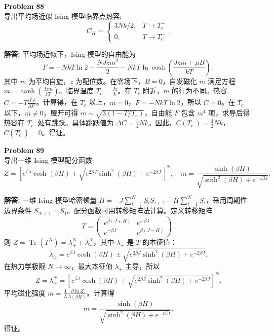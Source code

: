 \documentclass[12pt, a4paper, oneside]{ctexart}
\newenvironment{solution}{\par\noindent\textbf{解答:}\quad}{\par}
\begin{document}
\begin{mdframed}[backgroundcolor=gray!10, linewidth=0pt]
    \textbf{Problem 88} \\
    导出平均场近似 Ising 模型临界点热容:
    \[
    C_H = \begin{cases}
        3 N k / 2, & T \to T_c^- \\
        0, & T \to T_c^+
    \end{cases}.
    \]
\end{mdframed}
\begin{solution}
    平均场近似下，Ising 模型的自由能为
    \[
    F = -N k T \ln 2 + \frac{N J z m^2}{2} - N k T \ln \cosh \left( \frac{J z m + \mu B}{k T} \right),
    \]
    其中 $m$ 为平均自旋，$z$ 为配位数。在零场下，$B=0$，自发磁化 $m$ 满足方程 $m = \tanh \left( \frac{J z m}{k T} \right)$。临界温度 $T_c = \frac{J z}{k}$。在 $T_c$ 附近，$m$ 的行为不同。热容 $C = -T \frac{\partial^2 F}{\partial T^2}$。计算得，在 $T_c$ 以上，$m=0$，$F = -N k T \ln 2$，所以 $C = 0$。在 $T_c$ 以下，$m \neq 0$，展开可得 $m \sim \sqrt{3(1-T/T_c)}$，自由能 $F$ 包含 $m^4$ 项，求导后得热容在 $T_c^-$ 处有跳跃。具体跳跃值为 $\Delta C = \frac{3}{2} N k$。因此，$C(T_c^-) = \frac{3}{2} N k$，$C(T_c^+) = 0$。得证。
\end{solution}

\begin{mdframed}[backgroundcolor=gray!10, linewidth=0pt]
    \textbf{Problem 89} \\
    导出一维 Ising 模型配分函数:
    \[
    Z = \left[ e^{\beta J} \cosh(\beta H) + \sqrt{e^{2\beta J} \sinh^2(\beta H) + e^{-2\beta J}} \right]^N, \quad m = \frac{\sinh(\beta H)}{\sqrt{\sinh^2(\beta H) + e^{-4\beta J}}}.
    \]
\end{mdframed}
\begin{solution}
    一维 Ising 模型哈密顿量 $H = -J \sum_{i=1}^N S_i S_{i+1} - H \sum_{i=1}^N S_i$，采用周期性边界条件 $S_{N+1}=S_1$。配分函数可用转移矩阵法计算。定义转移矩阵
    \[
    T = \begin{pmatrix}
        e^{\beta(J+H)} & e^{-\beta J} \\
        e^{-\beta J} & e^{\beta(J-H)}
    \end{pmatrix}.
    \]
    则 $Z = \operatorname{Tr}(T^N) = \lambda_+^N + \lambda_-^N$，其中 $\lambda_\pm$ 是 $T$ 的本征值：
    \[
    \lambda_\pm = e^{\beta J} \cosh(\beta H) \pm \sqrt{e^{2\beta J} \sinh^2(\beta H) + e^{-2\beta J}}.
    \]
    在热力学极限 $N \to \infty$，最大本征值 $\lambda_+$ 主导，所以
    \[
    Z = \lambda_+^N = \left[ e^{\beta J} \cosh(\beta H) + \sqrt{e^{2\beta J} \sinh^2(\beta H) + e^{-2\beta J}} \right]^N.
    \]
    平均磁化强度 $m = \frac{1}{N} \frac{\partial \ln Z}{\partial (\beta H)}$。计算得
    \[
    m = \frac{\sinh(\beta H)}{\sqrt{\sinh^2(\beta H) + e^{-4\beta J}}}.
    \]
    得证。
\end{solution}
\end{document}
